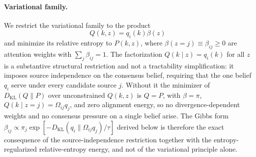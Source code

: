 \paragraph{Variational family.}
We restrict the variational family to the product
\begin{equation}
Q(k, z) = q_i(k) \beta(z)
\label{eq:mixture_posterior}
\end{equation}
and minimize its relative entropy to $P(k,z)$, where $\beta(z = j) \equiv \beta_{ij} \geq 0$ are attention weights with $\sum_j \beta_{ij} = 1$. The factorization $Q(k \mid z) = q_i(k)$ for all $z$ is a substantive structural restriction and not a tractability simplification: it imposes source independence on the consensus belief, requiring that the one belief $q_i$ serve under every candidate source $j$. Without it the minimizer of $D_{\mathrm{KL}}(Q \| P)$ over unconstrained $Q(k,z)$ is $Q = P$, with $\beta = \pi$, $Q(k \mid z{=}j) = \Omega_{ij}q_j$, and zero alignment energy, so no divergence-dependent weights and no consensus pressure on a single belief arise. The Gibbs form $\beta_{ij} \propto \pi_j \exp[-D_{\mathrm{KL}}(q_i \| \Omega_{ij}q_j)/\tau]$ derived below is therefore the exact consequence of the source-independence restriction together with the entropy-regularized relative-entropy energy, and not of the variational principle alone.

